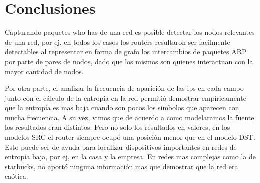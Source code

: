 \section{Conclusiones}

Capturando paquetes who-has de una red es posible detectar los nodos 
relevantes de una red, por ej, en todos los casos los routers resultaron
ser facilmente detectables al representar en forma de grafo los intercambios
de paquetes ARP por parte de pares de nodos, dado que los mismos son quienes
interactuan con la mayor cantidad de nodos. 

Por otra parte, el analizar la frecuencia de aparici\'on de las ips en cada
campo junto con el c\'alculo de la entrop\'ia en la red permiti\'o
demostrar emp\'iricamente que la entrop\'ia es mas baja cuando son pocos los 
s\'imbolos que aparecen
con mucha frecuencia. A su vez, vimos que de acuerdo a como modelaramos la
fuente los resultados eran distintos. Pero no solo los resultados en valores,
en los modelos SRC el router siempre ocup\'o una posici\'on
menor que en el modelo DST. 
Esto puede ser de ayuda para localizar dispositivos importantes en redes
de entrop\'ia baja, por ej, en la casa y la empresa. En redes
mas complejas como la de starbucks, no aport\'o ninguna informaci\'on mas
que demostrar que la red era ca\'otica. 
